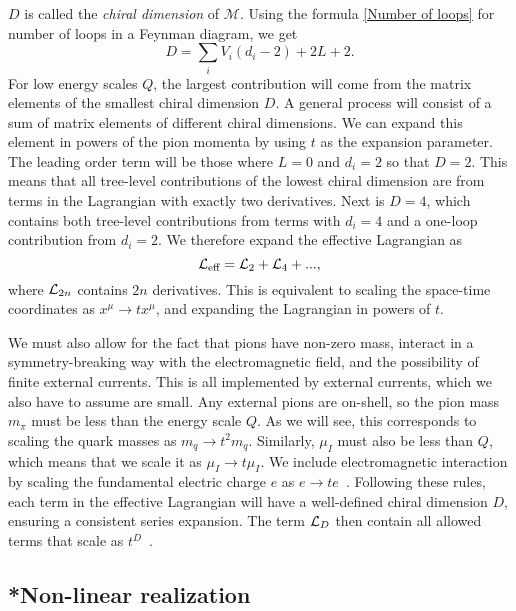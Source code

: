 $D$ is called the \emph{chiral dimension} of $\mathcal M$.
Using the formula \autoref{Number of loops} for number of loops in a Feynman diagram, we get
\begin{equation}
    D = \sum_i V_i(d_i - 2) + 2 L + 2.
\end{equation}
%
For low energy scales $Q$, the largest contribution will come from the matrix elements of the smallest chiral dimension $D$.
A general process will consist of a sum of matrix elements of different chiral dimensions.
We can expand this element in powers of the pion momenta by using $t$ as the expansion parameter.
The leading order term will be those where $L = 0$ and $d_i = 2$ so that $D = 2$.
This means that all tree-level contributions of the lowest chiral dimension are from terms in the Lagrangian with exactly two derivatives.
Next is $D = 4$, which contains both tree-level contributions from terms with $d_i = 4$ and a one-loop contribution from $d_i = 2$.
We therefore expand the effective Lagrangian as
\begin{equation}
    \mathcal{L}_\text{eff} = \mathcal{L}_2 + \mathcal{L}_4 + ...,
\end{equation}
%
where $\mathcal{L}_{2n}$ contains $2n$ derivatives.
This is equivalent to scaling the space-time coordinates as $x^\mu \rightarrow tx^\mu$, and expanding the Lagrangian in powers of $t$.

We must also allow for the fact that pions have non-zero mass, interact in a symmetry-breaking way with the electromagnetic field, and the possibility of finite external currents.
This is all implemented by external currents, which we also have to assume are small.
Any external pions are on-shell, so the pion mass $m_\pi$ must be less than the energy scale $Q$.
As we will see, this corresponds to scaling the quark masses as $m_q \rightarrow t^2 m_q$.
Similarly, $\mu_I$ must also be less than $Q$, which means that we scale it as $\mu_I\rightarrow t \mu_I$.
We include electromagnetic interaction by scaling the fundamental electric charge $e$ as $e\rightarrow te$~\autocite{urechVirtualPhotonsChiral1995}.
Following these rules, each term in the effective Lagrangian will have a well-defined chiral dimension $D$, ensuring a consistent series expansion.
The term $\mathcal{L}_{D}$ then contain all allowed terms that scale as $t^D$~\autocite{schererIntroductionChiralPerturbation2002,weinbergPhenomenologicalLagrangians1979,weinbergQuantumTheoryFields1996}.


\subsection{*Non-linear realization}

